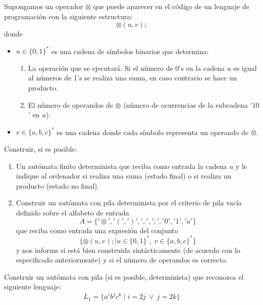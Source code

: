 \begin{ejercicio}\label{ej:1.5.24}
    Supongamos un operador $\otimes$ que puede aparecer en el código de un lenguaje de programación con la siguiente estructura:
    \begin{equation*}
        \otimes(u,v);
    \end{equation*}
    donde
    \begin{itemize}
        \item $u\in {\{0,1\}}^{\ast}$ es una cadena de símbolos binarios que determina:
            \begin{enumerate}[label=\alph*)]
                \item La operación que se ejecutará. Si el número de 0's en la cadena $u$ es igual al números de 1's se realiza una suma, en caso contrario se hace un producto.
                \item El número de operandos de $\otimes$ (número de ocurrencias de la subcadena '$10$' en $u$).
            \end{enumerate}
        \item $v\in {\{a,b,c\}}^{\ast}$ es una cadena donde cada símbolo representa un operando de $\otimes$.
    \end{itemize}
    Construir, si es posible:
    \begin{enumerate}[label=\alph*)]
        \item Un autómata finito determinista que reciba como entrada la cadena $u$ y le indique al ordenador si realiza una suma (estado final) o si realiza un producto (estado no final).
        \item Construir un autómata con pila determinista por el criterio de pila vacía definido sobre el alfabeto de entrada
            \begin{equation*}
                A = \{'\otimes', '(', ')', ',', ';', '0', '1', 'a'\}
            \end{equation*}
            que reciba como entrada una expresión del conjunto
            \begin{equation*}
                \{\otimes(u,v); \mid u\in {\{0,1\}}^{\ast},\ v\in {\{a,b,c\}}^{\ast}\}
            \end{equation*}
            y nos informe si está bien construida sintácticamente (de acuerdo con lo especificado anteriormente) y si el número de operandos es correcto.
    \end{enumerate}
\end{ejercicio}

\begin{ejercicio}\label{ej:1.5.25}
    Construir un autómata con pila (si es posible, determinista) que reconozca el siguiente lenguaje:
    \begin{equation*}
        L_1 = \{a^i b^j c^k \mid i = 2j\ \lor\ j = 2k\}
    \end{equation*}
\end{ejercicio}

